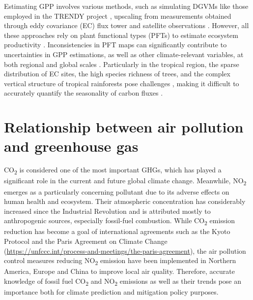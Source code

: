 Estimating GPP involves various methods, such as simulating DGVMs like those employed in the TRENDY project \citep{sitch2015recent, le2018global}, upscaling from measurements obtained through eddy covariance (EC) flux tower and satellite observations \citep{jung2019fluxcom, zeng2020global}. However, all these approaches rely on plant functional types (PFTs) to estimate ecosystem productivity \citep{poulter2011plant, poulter2015plant, lin2021improved, guo2023estimating, yan2023integrating}. Inconsistencies in PFT maps can significantly contribute to uncertainties in GPP estimations, as well as other climate-relevant variables, at both regional and global scales \citep{poulter2011plant}. Particularly in the tropical region, the sparse distribution of EC sites, the high species richness of trees, and the complex vertical structure of tropical rainforests pose challenges \citep{montgomery2001forest}, making it difficult to accurately quantify the seasonality of carbon fluxes \citep{xu2015satellite}. \par

\section{Relationship between air pollution and greenhouse gas}
CO\textsubscript{2} is considered one of the most important GHGs, which has played a significant role in the current and future global climate change. Meanwhile, NO\textsubscript{2} emerges as a particularly concerning pollutant due to its adverse effects on human health and ecosystem. Their atmospheric concentration has considerably increased since the Industrial Revolution and is attributed mostly to anthropogenic sources, especially fossil-fuel combustion. While CO\textsubscript{2} emission reduction has become a goal of international agreements such as the Kyoto Protocol \citep{protocol1997united} and the Paris Agreement on Climate Change (\url{https://unfccc.int/process-and-meetings/the-paris-agreement}), the air pollution control measures reducing NO\textsubscript{2} emission have been implemented in Northern America, Europe and China to improve local air quality. Therefore, accurate knowledge of fossil fuel CO\textsubscript{2} and NO\textsubscript{2} emissions as well as their trends pose an importance both for climate prediction and mitigation policy purposes. \par

